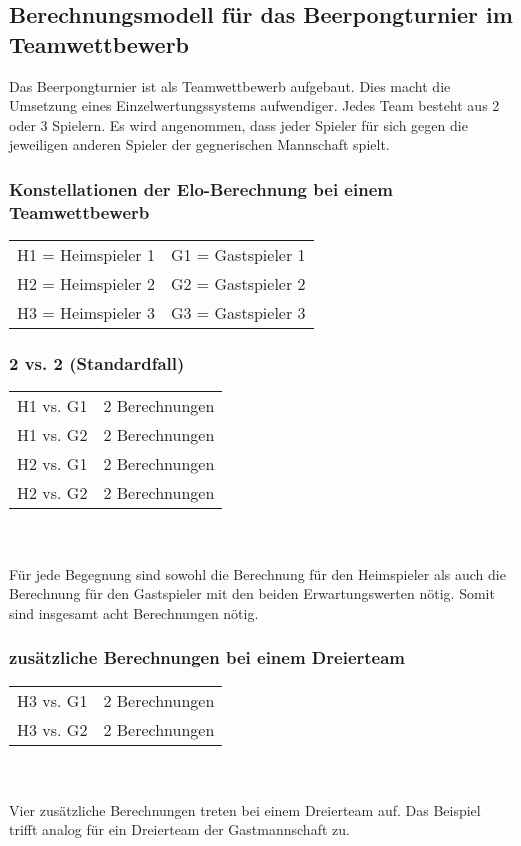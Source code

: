 \documentclass[a4paper, 12pt]{article}
\begin{document}
\subsection{Berechnungsmodell für das Beerpongturnier im Teamwettbewerb}
Das Beerpongturnier ist als Teamwettbewerb aufgebaut. Dies macht die Umsetzung eines Einzelwertungssystems aufwendiger. Jedes Team besteht aus 2 oder 3 Spielern.
Es wird angenommen, dass jeder Spieler für sich gegen die jeweiligen anderen Spieler der gegnerischen Mannschaft spielt.
\subsubsection{Konstellationen der Elo-Berechnung bei einem Teamwettbewerb}
\begin{tabular}{lr}
H1 = Heimspieler 1 & G1 = Gastspieler 1 \\
H2 = Heimspieler 2 & G2 = Gastspieler 2 \\
H3 = Heimspieler 3 & G3 = Gastspieler 3 \\
\end{tabular}
\subsubsection{2 vs. 2 (Standardfall)}
\begin{tabular}[h]{ll}
H1 vs. G1 & 2 Berechnungen \\
H1 vs. G2 & 2 Berechnungen \\
H2 vs. G1 & 2 Berechnungen \\
H2 vs. G2 & 2 Berechnungen \\
\end{tabular}
\\
\\Für jede Begegnung sind sowohl die Berechnung für den Heimspieler als auch die Berechnung für den Gastspieler mit den beiden Erwartungswerten nötig. Somit sind insgesamt acht Berechnungen nötig.

\subsubsection{zusätzliche Berechnungen bei einem Dreierteam}
\begin{tabular}[h]{ll}
H3 vs. G1 & 2 Berechnungen \\
H3 vs. G2 & 2 Berechnungen \\
\end{tabular}
\\
\\Vier zusätzliche Berechnungen treten bei einem Dreierteam auf. Das Beispiel trifft analog für ein Dreierteam der Gastmannschaft zu.
\end{document}
